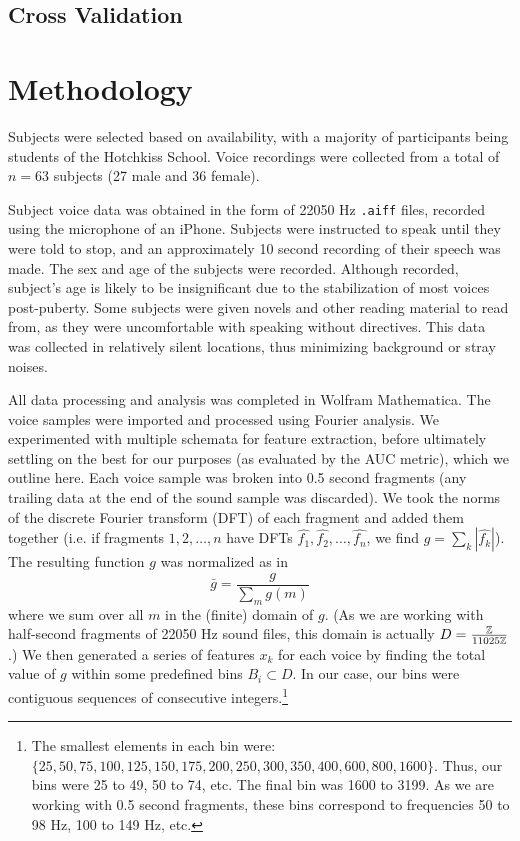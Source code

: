 \documentclass[10pt]{article}
\begin{document}
\subsection{Cross Validation}



%


\section{Methodology}


Subjects were selected based on availability, with a majority of participants being students of the Hotchkiss School.
Voice recordings were collected from a total of $n = 63$ subjects (27 male and 36 female). 

Subject voice data was obtained in the form of 22050 Hz \texttt{.aiff} files, recorded using the microphone of an iPhone.
Subjects were instructed to speak until they were told to stop, and an approximately 10 second recording of their speech was made.
The sex and age of the subjects were recorded.
Although recorded, subject’s age is likely to be insignificant due to the stabilization of most voices post-puberty. Some subjects were given novels and other reading material to read from, as they were uncomfortable with speaking without directives.
This data was collected in relatively silent locations, thus minimizing background or stray noises. 

All data processing and analysis was completed in Wolfram Mathematica.
The voice samples were imported and processed using Fourier analysis.
We experimented with multiple schemata for feature extraction, before ultimately settling on the best for our purposes (as evaluated by the AUC metric), which we outline here.
Each voice sample was broken into 0.5 second fragments (any trailing data at the end of the sound sample was discarded).
We took the norms of the discrete Fourier transform (DFT) of each fragment and added them together (i.e. if fragments $1, 2, \dots, n$ have DFTs $\hat{f_1},\hat{f_2}, \dots, \hat{f_n}$, we find $g = \sum_k |\hat{f_k}|$). The resulting function $g$ was normalized as in \[\bar{g} = \frac{g}{\sum\limits_m g(m)}\] where we sum over all $m$ in the (finite) domain of $g$.
(As we are working with half-second fragments of 22050 Hz sound files, this domain is actually $D = \frac{\mathbb{Z}}{11025\mathbb{Z}}$.)
We then generated a series of features $x_k$ for each voice by finding the total value of $g$ within some predefined bins $B_i\subset D$. In our case, our bins were contiguous sequences of consecutive integers.\footnote{The smallest elements in each bin were: $\{25, 50, 75, 100, 125, 150, 175, 200, 250, 300, 350, 400, 600, 800, 1600\}$. Thus, our bins were 25 to 49, 50 to 74, etc. The final bin was 1600 to 3199. As we are working with 0.5 second fragments, these bins correspond to frequencies 50 to 98 Hz, 100 to 149 Hz, etc.}
\end{document}
